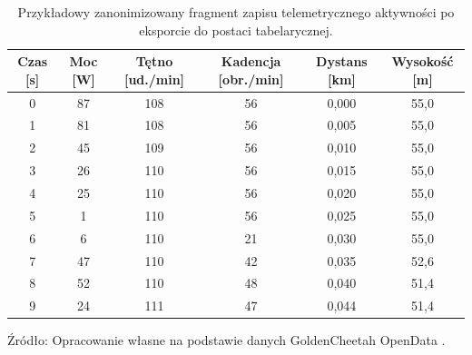 \begin{table}[htbp]
\centering
\caption{Przykładowy zanonimizowany fragment zapisu telemetrycznego aktywności po eksporcie do postaci tabelarycznej.}
\label{tab:fit_record_example}
\small
\setlength{\tabcolsep}{3.5pt}
\begin{tabular}{|c|c|c|c|c|c|}
\hline
\textbf{Czas [s]} & \textbf{Moc [W]} & \textbf{Tętno [ud./min]} & \textbf{Kadencja [obr./min]} & \textbf{Dystans [km]} & \textbf{Wysokość [m]} \\ \hline
0 & 87 & 108 & 56 & 0{,}000 & 55{,}0 \\ \hline
1 & 81 & 108 & 56 & 0{,}005 & 55{,}0 \\ \hline
2 & 45 & 109 & 56 & 0{,}010 & 55{,}0 \\ \hline
3 & 26 & 110 & 56 & 0{,}015 & 55{,}0 \\ \hline
4 & 25 & 110 & 56 & 0{,}020 & 55{,}0 \\ \hline
5 & 1 & 110 & 56 & 0{,}025 & 55{,}0 \\ \hline
6 & 6 & 110 & 21 & 0{,}030 & 55{,}0 \\ \hline
7 & 47 & 110 & 42 & 0{,}035 & 52{,}6 \\ \hline
8 & 52 & 110 & 48 & 0{,}040 & 51{,}4 \\ \hline
9 & 24 & 111 & 47 & 0{,}044 & 51{,}4 \\ \hline
\end{tabular}
\par\smallskip
\raggedright\footnotesize Źródło: Opracowanie własne na podstawie danych GoldenCheetah OpenData \parencite{osf_goldencheetah_opendata}.
\end{table}
